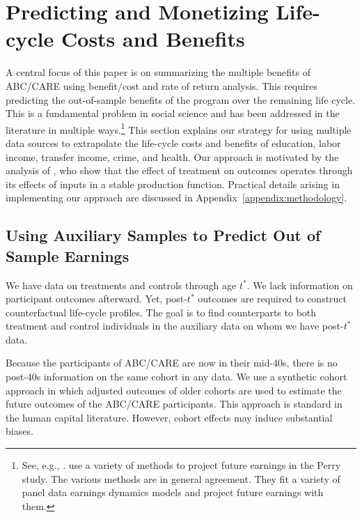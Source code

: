 \section{Predicting and Monetizing Life-cycle Costs and Benefits}\label{section:cbamethodology}

A central focus of this paper is on summarizing the multiple benefits of ABC/CARE using benefit/cost and rate of return analysis. This requires predicting the out-of-sample benefits of the program over the remaining life cycle. This is a fundamental problem in social science and has been addressed in the literature in multiple ways.\footnote{See, e.g., \cite{Heckman_Lochner_ea_2006_HEE}. \citet{Heckman_Moon_etal_2010_RateofReturn} use a variety of methods to project future earnings in the Perry study. The various methods are in general agreement. They fit a variety of panel data earnings dynamics models and project future earnings with them.} This section explains our strategy for using multiple data sources to extrapolate the life-cycle costs and benefits of education, labor income, transfer income, crime, and health. Our approach is motivated by the analysis of \citet{Heckman_Pinto_etal_2013_PerryFactor}, who show that the effect of treatment on outcomes operates through its effects of inputs in a stable production function. Practical details arising in implementing our approach are discussed in Appendix~\ref{appendix:methodology}.

\subsection{Using Auxiliary Samples to Predict Out of Sample Earnings}\label{sec:necrosis}

We have data on treatments and controls through age $t^{\ast}$. We lack information on participant outcomes afterward. Yet, post-$t^{\ast}$ outcomes are required to construct counterfactual life-cycle profiles. The goal is to find counterparts to both treatment and control individuals in the auxiliary data on whom we have post-$t^{\ast}$ data.

Because the participants of ABC/CARE are now in their mid-40s, there is no post-40s information on the same cohort  in any data. We use a synthetic cohort approach in which adjusted outcomes of older cohorts are used to estimate the future outcomes of the ABC/CARE participants. This approach is standard in the human capital literature. However, cohort effects may induce substantial biases.

